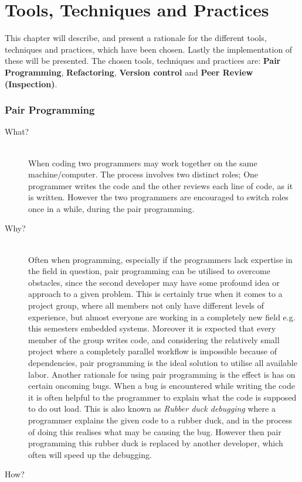 
\chapter{Tools, Techniques and Practices} %
\label{cha:tools_techniques_and_practices}
This chapter will describe, and present a rationale for the different tools, techniques and practices, which have been chosen.
Lastly the implementation of these will be presented.
The chosen tools, techniques and practices are: \textbf{Pair Programming}, \textbf{Refactoring}, \textbf{Version control} and \textbf{Peer Review (Inspection)}.

\subsection*{Pair Programming} %
\label{sub:pair_programming}
\begin{description}
    \item[What?]\hfill\\
    When coding two programmers may work together on the same machine/computer.
The process involves two distinct roles; One programmer writes the code and the other reviews each line of code, as it is written. 
However the two programmers are encouraged to switch roles once in a while, during the pair programming.
    
    \item[Why?]\hfill\\ 
    Often when programming, especially if the programmers lack expertise in the field in question, pair programming can be utilised to overcome obstacles, since the second developer may have some profound idea or approach to a given problem.
    This is certainly true when it comes to a project group, where all members not only have different levels of experience, but almost everyone are working in a completely new field e.g. this semesters embedded systems.
    Moreover it is expected that every member of the group writes code, and considering the relatively small project where a completely parallel workflow is impossible because of dependencies, pair programming is the ideal solution to utilise all available labor.
    Another rationale for using pair programming is the effect is has on certain oncoming bugs.
    When a bug is encountered while writing the code it is often helpful to the programmer to explain what the code is supposed to do out load.
    This is also known as \emph{Rubber duck debugging} where a programmer explains the given code to a rubber duck, and in the process of doing this realises what may be causing the bug.
    However then pair programming this rubber duck is replaced by another developer, which often will speed up the debugging.
    
    \item[How?]\hfill\\
    
\end{description}
